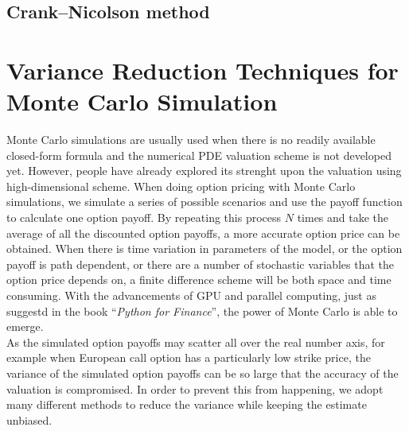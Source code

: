 \subsection{Crank–Nicolson method}
\newpage

\section{Variance Reduction Techniques for Monte Carlo Simulation}
Monte Carlo simulations are usually used when there is no readily available closed-form formula and the numerical PDE valuation scheme is not developed yet. However, people have already explored its strenght upon the valuation using high-dimensional scheme. When doing option pricing with Monte Carlo simulations, we simulate a series of possible scenarios and use the payoff function to calculate one option payoff. By repeating this process $N$ times and take the average of all the discounted option payoffs, a more accurate option price can be obtained. When there is time variation in parameters of the model, or the option payoff is path dependent, or there are a number of stochastic variables that the option price depends on, a finite difference scheme will be both space and time consuming. With the advancements of GPU and parallel computing, just as suggestd in the book ``\emph{Python for Finance}'', the power of Monte Carlo is able to emerge.\\
As the simulated option payoffs may scatter all over the real number axis, for example when European call option has a particularly low strike price, the variance of the simulated option payoffs can be so large that the accuracy of the valuation is compromised. In order to prevent this from happening, we adopt many different methods to reduce the variance while keeping the estimate unbiased.
\newpage

